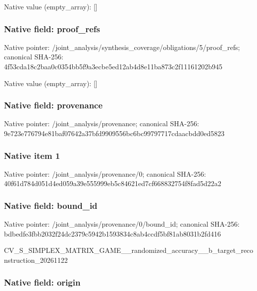 \documentclass[10pt,a4paper]{article}
\begin{document}
Native value (empty\_array): []



\subsubsection{Native field: proof\_refs}


Native pointer: /joint\_analysis/synthesi\allowbreak{}s\_coverage/obligations/5\allowbreak{}/proof\_refs; canonical SHA-256: 4f53cda18c2baa0c0354bb5f\allowbreak{}9a3ecbe5ed12ab4d8e11ba87\allowbreak{}3c2f11161202b945



Native value (empty\_array): []



\subsubsection{Native field: provenance}


Native pointer: /joint\_analysis/provenance; canonical SHA-256: 9e723e776794e81baf07642a\allowbreak{}37bfd9909556bc6bc9979771\allowbreak{}7cdaacbdd0ed5823



\subsubsection{Native item 1}


Native pointer: /joint\_analysis/provenance/0; canonical SHA-256: 40f61d784d051d4ed059a39e\allowbreak{}555999eb5c84621ed7cf6688\allowbreak{}32754f8fad5d22a2



\subsubsection{Native field: bound\_id}


Native pointer: /joint\_analysis/provenance/0/bound\_id; canonical SHA-256: bdbedfe3fbb2032f24dc2379\allowbreak{}c5942b1593834c8ab4ccdf5b\allowbreak{}f81ab8031b2fd416


CV\_S\_SIMPLEX\_MATRIX\_GAME\allowbreak{}\_\_randomized\_accuracy\_\_b\allowbreak{}\_target\_reconstruction\_2\allowbreak{}0261122


\subsubsection{Native field: origin}
\end{document}
